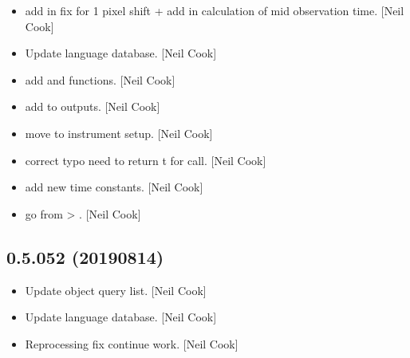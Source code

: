 \documentclass[a4paper,10pt,english]{report}
\begin{document}
\begin{itemize}
\item {} 
 \sphinxhyphen{} add in fix for 1 pixel shift + add in
calculation of mid observation time. {[}Neil Cook{]}

\item {} 
Update language database. {[}Neil Cook{]}

\item {} 
 \sphinxhyphen{} add  and  functions.
{[}Neil Cook{]}

\item {} 
 \sphinxhyphen{} add  to
outputs. {[}Neil Cook{]}

\item {} 
 \sphinxhyphen{} move  to instrument
setup. {[}Neil Cook{]}

\item {} 
 \sphinxhyphen{} correct typo need to return t for 
call. {[}Neil Cook{]}

\item {} 
 \sphinxhyphen{} add new time constants. {[}Neil Cook{]}

\item {} 
 \sphinxhyphen{} go from  \textendash{}\textgreater{} . {[}Neil Cook{]}

\end{itemize}


\subsection{0.5.052 (2019\sphinxhyphen{}08\sphinxhyphen{}14)}
\label{\detokenize{misc/changelog:id109}}\begin{itemize}
\item {} 
Update object query list. {[}Neil Cook{]}

\item {} 
Update language database. {[}Neil Cook{]}

\item {} 
Reprocessing fix \sphinxhyphen{} continue work. {[}Neil Cook{]}

\end{itemize}
\end{document}
